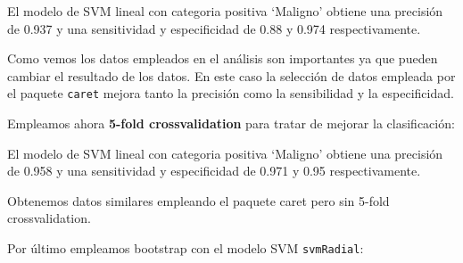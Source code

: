 \documentclass[
]{article}
\newenvironment{Shaded}{\begin{snugshade}}{\end{snugshade}}
\newcommand{\CommentTok}[1]{\textcolor[rgb]{0.56,0.35,0.01}{\textit{#1}}}
\newcommand{\DataTypeTok}[1]{\textcolor[rgb]{0.13,0.29,0.53}{#1}}
\newcommand{\DecValTok}[1]{\textcolor[rgb]{0.00,0.00,0.81}{#1}}
\newcommand{\KeywordTok}[1]{\textcolor[rgb]{0.13,0.29,0.53}{\textbf{#1}}}
\newcommand{\NormalTok}[1]{#1}
\newcommand{\OperatorTok}[1]{\textcolor[rgb]{0.81,0.36,0.00}{\textbf{#1}}}
\newcommand{\OtherTok}[1]{\textcolor[rgb]{0.56,0.35,0.01}{#1}}
\newcommand{\StringTok}[1]{\textcolor[rgb]{0.31,0.60,0.02}{#1}}
\begin{document}
El modelo de SVM lineal con categoria positiva `Maligno' obtiene una
precisión de 0.937 y una sensitividad y especificidad de 0.88 y 0.974
respectivamente.

Como vemos los datos empleados en el análisis son importantes ya que
pueden cambiar el resultado de los datos. En este caso la selección de
datos empleada por el paquete \texttt{caret} mejora tanto la precisión
como la sensibilidad y la especificidad.

Empleamos ahora \textbf{5-fold crossvalidation} para tratar de mejorar
la clasificación:

\begin{Shaded}
\end{Shaded}

El modelo de SVM lineal con categoria positiva `Maligno' obtiene una
precisión de 0.958 y una sensitividad y especificidad de 0.971 y 0.95
respectivamente.

Obtenemos datos similares empleando el paquete caret pero sin 5-fold
crossvalidation.

Por último empleamos bootstrap con el modelo SVM \texttt{svmRadial}:
\end{document}

